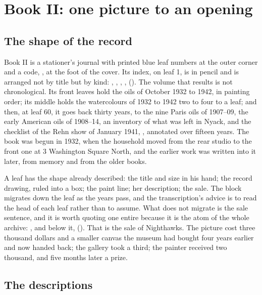 \chapter{Book II: one picture to an opening}

\section{The shape of the record}

Book II is a stationer's journal with printed blue leaf numbers at the outer corner and a code, , at the foot of the cover. Its index, on leaf 1, is in pencil and is arranged not by title but by kind: , , , ,  (). The volume that results is not chronological. Its front leaves hold the oils of October 1932 to 1942, in painting order; its middle holds the watercolours of 1932 to 1942 two to four to a leaf; and then, at leaf 60, it goes back thirty years, to the nine Paris oils of 1907--09, the early American oils of 1908--14, an inventory of what was left in Nyack, and the checklist of the Rehn show of January 1941, , annotated over fifteen years. The book was begun in 1932, when the household moved from the rear studio to the front one at 3 Washington Square North, and the earlier work was written into it later, from memory and from the older books.

A leaf has the shape already described: the title and size in his hand; the record drawing, ruled into a box; the paint line; her description; the sale. The block migrates down the leaf as the years pass, and the transcription's advice is to read the head of each leaf rather than to assume. What does not migrate is the sale sentence, and it is worth quoting one entire because it is the atom of the whole archive: , and below it,  (). That is the sale of Nighthawks. The picture cost three thousand dollars and a smaller canvas the museum had bought four years earlier and now handed back; the gallery took a third; the painter received two thousand, and five months later a prize.

\section{The descriptions}

